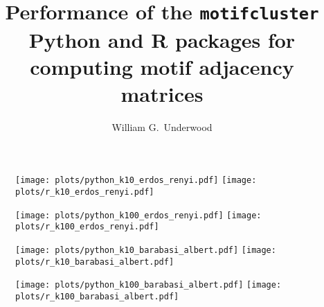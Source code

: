 \documentclass{article}
\author{William G.\ Underwood}
\title{Performance of the \texttt{motifcluster}
  Python and R packages
  for computing motif adjacency matrices}
\begin{document}
\maketitle


\begin{figure}[H]
  \centering
  \texttt{[image: plots/python\_k10\_erdos\_renyi.pdf]}
  \texttt{[image: plots/r\_k10\_erdos\_renyi.pdf]}
\end{figure}

\pagebreak

\begin{figure}[H]
  \centering
  \texttt{[image: plots/python\_k100\_erdos\_renyi.pdf]}
  \texttt{[image: plots/r\_k100\_erdos\_renyi.pdf]}
\end{figure}

\pagebreak

\begin{figure}[H]
  \centering
  \texttt{[image: plots/python\_k10\_barabasi\_albert.pdf]}
  \texttt{[image: plots/r\_k10\_barabasi\_albert.pdf]}
\end{figure}

\pagebreak

\begin{figure}[H]
  \centering
  \texttt{[image: plots/python\_k100\_barabasi\_albert.pdf]}
  \texttt{[image: plots/r\_k100\_barabasi\_albert.pdf]}
\end{figure}

\pagebreak
\end{document}

